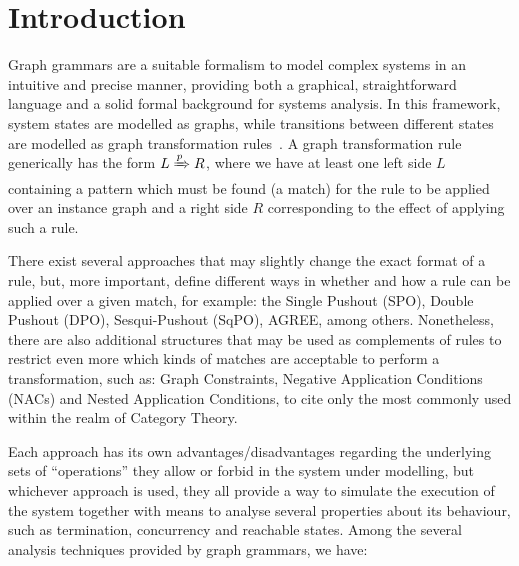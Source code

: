 \chapter{Introduction}

Graph grammars are a suitable formalism to model complex systems in an intuitive and precise manner, providing both a graphical, straightforward language and a solid formal background for systems analysis. In this framework, system states are modelled as graphs, while transitions between different states are modelled as graph transformation rules~\cite{Ehrig2006}. A graph transformation rule generically has the form $L \xRightarrow{p} R$, where we have at least one left side $L$ containing a pattern which must be found (a match) for the rule to be applied over an instance graph and a right side $R$ corresponding to the effect of applying such a rule.

There exist several approaches that may slightly change the exact format of a rule, but, more important, define different ways in whether and how a rule can be applied over a given match, for example: the Single Pushout (SPO), Double Pushout (DPO), Sesqui-Pushout (SqPO), AGREE, among others. Nonetheless, there are also additional structures that may be used as complements of rules to restrict even more which kinds of matches are acceptable to perform a transformation, such as: Graph Constraints, Negative Application Conditions (NACs) and Nested Application Conditions, to cite only the most commonly used within the realm of Category Theory.

Each approach has its own advantages/disadvantages regarding the underlying sets of  ``operations'' they allow or forbid in the system under modelling, but whichever approach is used, they all provide a way to simulate the execution of the system together with means to analyse several properties about its behaviour, such as termination, concurrency and reachable states. Among the several analysis techniques provided by graph grammars, we have:

